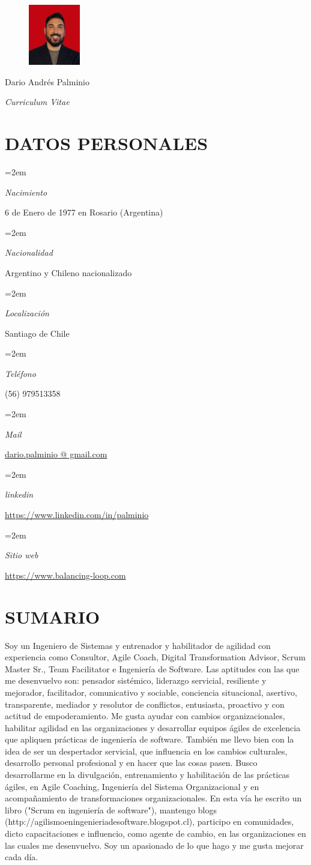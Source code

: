 \documentclass[paper=a4,fontsize=11pt]{scrartcl} %
\newlength{\spacebox}
\newcommand{\sepspace}{\vspace*{1em}}		%
\newcommand{\MyName}[1]{ %
		\Huge \usefont{OT1}{phv}{b}{n} \hfill #1
		\par \normalsize \normalfont}
\newcommand{\MySlogan}[1]{ %
		\large \usefont{OT1}{phv}{m}{n}\hfill \textit{#1}
		\par \normalsize \normalfont}
\newcommand{\NewPart}[1]{\section*{\uppercase{#1}}}
\newcommand{\PersonalEntry}[2]{
		\noindent\hangindent=2em\hangafter=0 %
		\parbox{\spacebox}{        %
		\textit{#1}}		       %
		\hspace{1.5em} #2 \par}    %
\begin{document}

\begin{figure}
	\hfill
	\includegraphics[width=0.2\textwidth]{photo1}
	\vspace{-7cm}
\end{figure}

\MyName{Dario Andrés Palminio}
\MySlogan{Curriculum Vitae}

\sepspace

\NewPart{Datos personales}{}

\PersonalEntry{Nacimiento}{6 de Enero de 1977 en Rosario (Argentina)}
\PersonalEntry{Nacionalidad}{Argentino y Chileno nacionalizado}
\PersonalEntry{Localización}{Santiago de Chile}
\PersonalEntry{Teléfono}{(56) 979513358}
\PersonalEntry{Mail}{\url{dario.palminio  @  gmail.com}}
\PersonalEntry{linkedin}{\url{https://www.linkedin.com/in/palminio}}
\PersonalEntry{Sitio web}{\url{https://www.balancing-loop.com}}

\NewPart{Sumario}{}

Soy un Ingeniero de Sistemas y entrenador y habilitador de agilidad con experiencia como Consultor, Agile Coach, Digital Transformation Advisor, Scrum Master Sr., Team Facilitator e Ingeniería de Software. Las aptitudes con las que me desenvuelvo son: pensador sistémico, liderazgo servicial, resiliente y mejorador, facilitador, comunicativo y sociable, conciencia situacional, asertivo, transparente, mediador y resolutor de conflictos, entusiasta, proactivo y con actitud de empoderamiento.
Me gusta ayudar con cambios organizacionales, habilitar agilidad en las organizaciones y desarrollar equipos ágiles de excelencia que apliquen prácticas de ingeniería de software. También me llevo bien con la idea de ser un despertador servicial, que influencia en los cambios culturales, desarrollo personal profesional y en hacer que las cosas pasen. Busco desarrollarme en la divulgación, entrenamiento y habilitación de las prácticas ágiles, en Agile Coaching, Ingeniería del Sistema Organizacional y en acompañamiento de transformaciones organizacionales. En esta vía he escrito un libro ("Scrum en ingeniería de software"), mantengo blogs (http://agilismoeningenieriadesoftware.blogspot.cl), participo en comunidades, dicto capacitaciones e influencio, como agente de cambio, en las organizaciones en las cuales me desenvuelvo. Soy un apasionado de lo que hago y me gusta mejorar cada día.
\end{document}
